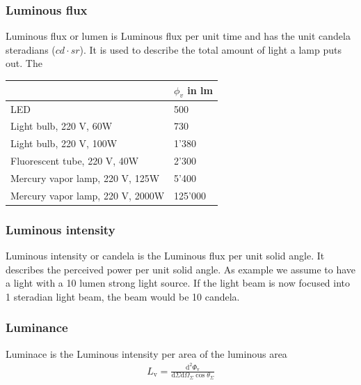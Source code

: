 \subsubsection{Luminous flux}
Luminous flux or lumen is Luminous flux per unit time and has the unit candela steradians ($cd\cdot sr$). It is used to describe the total amount of light a lamp puts out. The 
\begin{table}[ht]
	\centering
	\begin{tabular}{ |p{14cm} p{2cm}|  }
		\hline
		& $\phi_v$ in lm\\
		
		
		\hline
		LED		& 500\\
		Light bulb, 220 V, 60W		& 730\\
		Light bulb, 220 V, 100W		& 1'380\\
		Fluorescent tube, 220 V, 40W		& 2'300\\
		Mercury vapor lamp, 220 V, 125W		& 5'400\\
		Mercury vapor lamp, 220 V, 2000W		& 125'000\\
		\hline
	\end{tabular}
\end{table}

\subsubsection{Luminous intensity}
Luminous intensity or candela is the Luminous flux per unit solid angle. It describes the perceived power per unit solid angle. As example we assume to have a light with a 10 lumen strong light source. If the light beam is now focused into 1 steradian light beam, the beam would be 10 candela.\\

\subsubsection{Luminance}
Luminace is the Luminous intensity per area of the luminous area
\begin{align*}
L_{\mathrm{v}}=\frac{\mathrm{d}^{2} \Phi_{\mathrm{v}}}{\mathrm{d} \Sigma \mathrm{d} \Omega_{\Sigma} \cos \theta_{\Sigma}}
\end{align*}\\

